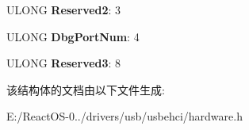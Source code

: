 \begin{DoxyCompactItemize}
\item 
\mbox{\label{struct___e_h_c_i___h_c_s___c_o_n_t_e_n_t_ab85251df5d942e3b9e3d8b512b1b98be}} 
U\+L\+O\+NG {\bfseries Reserved2}\+: 3
\item 
\mbox{\label{struct___e_h_c_i___h_c_s___c_o_n_t_e_n_t_a4a0afcad8156c9bee34a64a547ea6a93}} 
U\+L\+O\+NG {\bfseries Dbg\+Port\+Num}\+: 4
\item 
\mbox{\label{struct___e_h_c_i___h_c_s___c_o_n_t_e_n_t_a84e085aab090e0dacf45b3c13565125c}} 
U\+L\+O\+NG {\bfseries Reserved3}\+: 8
\end{DoxyCompactItemize}


该结构体的文档由以下文件生成\+:\begin{DoxyCompactItemize}
\item 
E\+:/\+React\+O\+S-\/0../drivers/usb/usbehci/hardware.\+h\end{DoxyCompactItemize}
